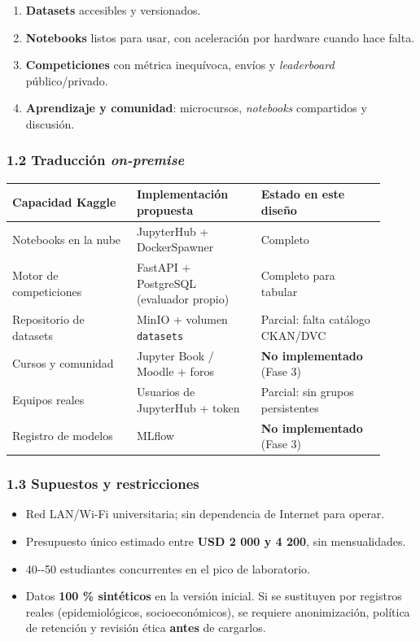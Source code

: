 \documentclass[11pt,a4paper]{article}
\providecommand{\tightlist}{%
  \setlength{\itemsep}{0pt}\setlength{\parskip}{0pt}}
\begin{document}
\begin{enumerate}
\def\labelenumi{\arabic{enumi}.}
\tightlist
\item
  \textbf{Datasets} accesibles y versionados.
\item
  \textbf{Notebooks} listos para usar, con aceleración por hardware cuando hace falta.
\item
  \textbf{Competiciones} con métrica inequívoca, envíos y \emph{leaderboard} público/privado.
\item
  \textbf{Aprendizaje y comunidad}: microcursos, \emph{notebooks} compartidos y discusión.
\end{enumerate}

\hypertarget{12-traducciuxf3n-on-premise}{%
\subsubsection{\texorpdfstring{1.2 Traducción \emph{on-premise}}{1.2 Traducción on-premise}}\label{12-traducciuxf3n-on-premise}}

\begin{longtable}[]{@{}p{0.302\linewidth}p{0.302\linewidth}p{0.302\linewidth}@{}}
\toprule
Capacidad Kaggle & Implementación propuesta & Estado en este diseño \\
\midrule
\endhead
Notebooks en la nube & JupyterHub + DockerSpawner & Completo \\
Motor de competiciones & FastAPI + PostgreSQL (evaluador propio) & Completo para tabular \\
Repositorio de datasets & MinIO + volumen \texttt{datasets} & Parcial: falta catálogo CKAN/DVC \\
Cursos y comunidad & Jupyter Book / Moodle + foros & \textbf{No implementado} (Fase 3) \\
Equipos reales & Usuarios de JupyterHub + token & Parcial: sin grupos persistentes \\
Registro de modelos & MLflow & \textbf{No implementado} (Fase 3) \\
\bottomrule
\end{longtable}

\hypertarget{13-supuestos-y-restricciones}{%
\subsubsection{1.3 Supuestos y restricciones}\label{13-supuestos-y-restricciones}}

\begin{itemize}
\tightlist
\item
  Red LAN/Wi-Fi universitaria; sin dependencia de Internet para operar.
\item
  Presupuesto único estimado entre \textbf{USD 2 000 y 4 200}, sin mensualidades.
\item
  40-\/-50 estudiantes concurrentes en el pico de laboratorio.
\item
  Datos \textbf{100 \% sintéticos} en la versión inicial. Si se sustituyen por registros reales (epidemiológicos, socioeconómicos), se requiere anonimización, política de retención y revisión ética \textbf{antes} de cargarlos.
\end{itemize}
\end{document}
